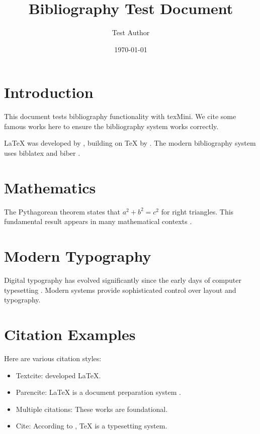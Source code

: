 \documentclass[11pt]{article}
\title{Bibliography Test Document}
\author{Test Author}
\date{\today}
\begin{document}
\maketitle

\section{Introduction}

This document tests bibliography functionality with texMini. We cite some famous works here to ensure the bibliography system works correctly.

LaTeX was developed by \textcite{lamport1994latex}, building on \TeX{} by \textcite{knuth1984texbook}. The modern bibliography system uses biblatex and biber \parencite{lehman2022biblatex}.

\section{Mathematics}

The Pythagorean theorem states that $a^2 + b^2 = c^2$ for right triangles. This fundamental result appears in many mathematical contexts \parencite{euclid300elements}.

\section{Modern Typography}

Digital typography has evolved significantly since the early days of computer typesetting \parencite{knuth1979tex}. Modern systems provide sophisticated control over layout and typography.

\section{Citation Examples}

Here are various citation styles:

\begin{itemize}
    \item Textcite: \textcite{lamport1994latex} developed LaTeX.
    \item Parencite: LaTeX is a document preparation system \parencite{lamport1994latex}.
    \item Multiple citations: These works \parencite{knuth1984texbook,lamport1994latex,lehman2022biblatex} are foundational.
    \item Cite: According to \cite{knuth1984texbook}, \TeX{} is a typesetting system.
\end{itemize}
\end{document}
